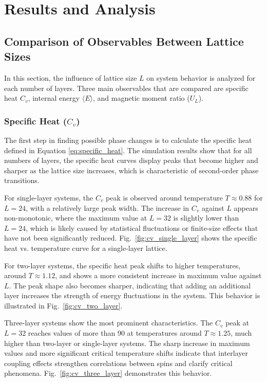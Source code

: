 \section{Results and Analysis}

\subsection{Comparison of Observables Between Lattice Sizes}

In this section, the influence of lattice size $L$ on system behavior is analyzed for each number of layers. Three main observables that are compared are specific heat $C_v$, internal energy $\langle E \rangle$, and magnetic moment ratio ($U_L$).

\subsubsection{Specific Heat ($C_v$)}

The first step in finding possible phase changes is to calculate the specific heat defined in Equation \ref{eq:specific_heat}. The simulation results show that for all numbers of layers, the specific heat curves display peaks that become higher and sharper as the lattice size increases, which is characteristic of second-order phase transitions.

For single-layer systems, the $C_v$ peak is observed around temperature $T \approx 0.88$ for $L = 24$, with a relatively large peak width. The increase in $C_v$ against $L$ appears non-monotonic, where the maximum value at $L = 32$ is slightly lower than $L = 24$, which is likely caused by statistical fluctuations or finite-size effects that have not been significantly reduced. Fig.~\ref{fig:cv_single_layer} shows the specific heat vs. temperature curve for a single-layer lattice.

For two-layer systems, the specific heat peak shifts to higher temperatures, around $T \approx 1.12$, and shows a more consistent increase in maximum value against $L$. The peak shape also becomes sharper, indicating that adding an additional layer increases the strength of energy fluctuations in the system. This behavior is illustrated in Fig.~\ref{fig:cv_two_layer}.

Three-layer systems show the most prominent characteristics. The $C_v$ peak at $L = 32$ reaches values of more than 90 at temperatures around $T \approx 1.25$, much higher than two-layer or single-layer systems. The sharp increase in maximum values and more significant critical temperature shifts indicate that interlayer coupling effects strengthen correlations between spins and clarify critical phenomena. Fig.~\ref{fig:cv_three_layer} demonstrates this behavior.

